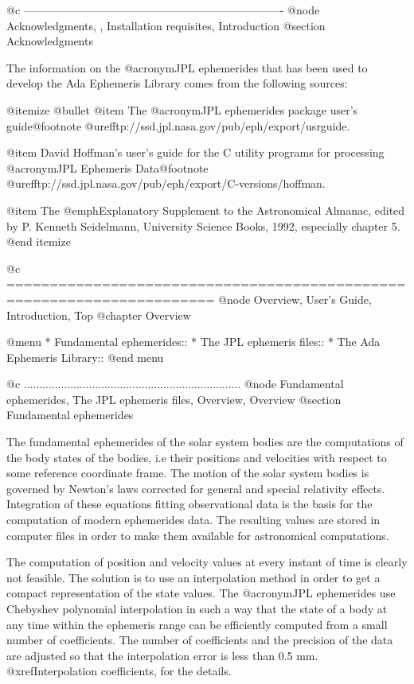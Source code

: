 @c ----------------------------------------------------------------------
@node Acknowledgments,  , Installation requisites, Introduction
@section Acknowledgments

The information on the @acronym{JPL} ephemerides that has been used to
develop the Ada Ephemeris Library comes from the following sources:

@itemize @bullet
@item The @acronym{JPL} ephemerides package user's guide@footnote{
@uref{ftp://ssd.jpl.nasa.gov/pub/eph/export/usrguide}}.

@item David Hoffman's user's guide for the C utility programs for
processing @acronym{JPL} Ephemeris Data@footnote{
@uref{ftp://ssd.jpl.nasa.gov/pub/eph/export/C-versions/hoffman}}.

@item The @emph{Explanatory Supplement to the Astronomical Almanac},
edited by P. Kenneth Seidelmann, University Science Books, 1992,
especially chapter 5.
@end itemize

@c ======================================================================
@node Overview, User's Guide, Introduction, Top
@chapter Overview

@menu
* Fundamental ephemerides::     
* The JPL ephemeris files::     
* The Ada Ephemeris Library::   
@end menu


@c ......................................................................
@node Fundamental ephemerides, The JPL ephemeris files, Overview, Overview
@section Fundamental ephemerides

The fundamental ephemerides of the solar system bodies are the
computations of the body states of the bodies, i.e their positions and
velocities with respect to some reference coordinate frame.  The
motion of the solar system bodies is governed by Newton's laws
corrected for general and special relativity effects. Integration of
these equations fitting observational data is the basis for the
computation of modern ephemerides data. The resulting values are
stored in computer files in order to make them available for
astronomical computations.

The computation of position and velocity values at every instant of
time is clearly not feasible. The solution is to use an interpolation
method in order to get a compact representation of the state
values. The @acronym{JPL} ephemerides use Chebyshev polynomial
interpolation in such a way that the state of a body at any time
within the ephemeris range can be efficiently computed from a small
number of coefficients. The number of coefficients and the precision
of the data are adjusted so that the interpolation error is less than
0.5 mm. @xref{Interpolation coefficients}, for the details.

